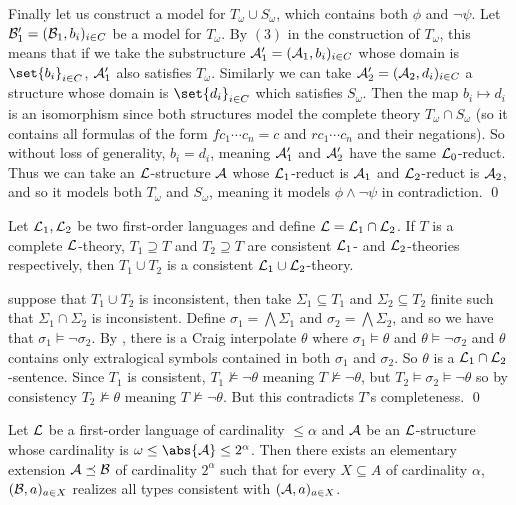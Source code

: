 Finally let us construct a model for $T_\omega\cup S_\omega$, which contains both $\phi$ and $\neg\psi$.
Let ${\cal B}_1'=({\cal B}_1,b_i)_{i\in C}$ be a model for $T_\omega$.
By $(3)$ in the construction of $T_\omega$, this means that if we take the substructure ${\cal A}_1'=({\cal A}_1,b_i)_{i\in C}$ whose domain is $\set{b_i}_{i\in C}$, ${\cal A}_1'$ also satisfies $T_\omega$.
Similarly we can take ${\cal A}_2'=({\cal A}_2,d_i)_{i\in C}$ a structure whose domain is $\set{d_i}_{i\in C}$ which satisfies $S_\omega$.
Then the map $b_i\mapsto d_i$ is an isomorphism since both structures model the complete theory $T_\omega\cap S_\omega$ (so it contains all formulas of the form $fc_1\cdots c_n=c$ and $rc_1\cdots c_n$ and
their negations).
So without loss of generality, $b_i=d_i$, meaning ${\cal A}_1'$ and ${\cal A}_2'$ have the same ${\cal L}_0$-reduct.
Thus we can take an ${\cal L}$-structure ${\cal A}$ whose ${\cal L}_1$-reduct is ${\cal A}_1$ and ${\cal L}_2$-reduct is ${\cal A}_2$, and so it models both $T_\omega$ and $S_\omega$, meaning it models
$\phi\land\neg\psi$ in contradiction.
\qed

\bthrm[title=Robinson's Theorem, name=robinsonthrm]

    Let ${\cal L}_1,{\cal L}_2$ be two first-order languages and define ${\cal L}={\cal L}_1\cap{\cal L}_2$.
    If $T$ is a complete ${\cal L}$-theory, $T_1\supseteq T$ and $T_2\supseteq T$ are consistent ${\cal L}_1$- and ${\cal L}_2$-theories respectively, then $T_1\cup T_2$ is a consistent
    ${\cal L}_1\cup{\cal L}_2$-theory.

\ethrm

\Proof suppose that $T_1\cup T_2$ is inconsistent, then take $\Sigma_1\subseteq T_1$ and $\Sigma_2\subseteq T_2$ finite such that $\Sigma_1\cap\Sigma_2$ is inconsistent.
Define $\sigma_1=\bigwedge\Sigma_1$ and $\sigma_2=\bigwedge\Sigma_2$, and so we have that $\sigma_1\vDash\neg\sigma_2$.
By , there is a Craig interpolate $\theta$ where $\sigma_1\vDash\theta$ and $\theta\vDash\neg\sigma_2$ and $\theta$ contains only extralogical symbols contained in both $\sigma_1$ and
$\sigma_2$.
So $\theta$ is a ${\cal L}_1\cap{\cal L}_2$-sentence.
Since $T_1$ is consistent, $T_1\nvDash\neg\theta$ meaning $T\nvDash\neg\theta$, but $T_2\vDash\sigma_2\vDash\neg\theta$ so by consistency $T_2\nvDash\theta$ meaning $T\nvDash\neg\theta$.
But this contradicts $T$'s completeness.
\qed

\blemm

    Let ${\cal L}$ be a first-order language of cardinality $\leq\alpha$ and ${\cal A}$ be an ${\cal L}$-structure whose cardinality is $\omega\leq\abs{\cal A}\leq 2^\alpha$.
    Then there exists an elementary extension ${\cal A}\preceq{\cal B}$ of cardinality $2^\alpha$ such that for every $X\subseteq A$ of cardinality $\alpha$, $({\cal B},a)_{a\in X}$ realizes all
    types consistent with $({\cal A},a)_{a\in X}$.

